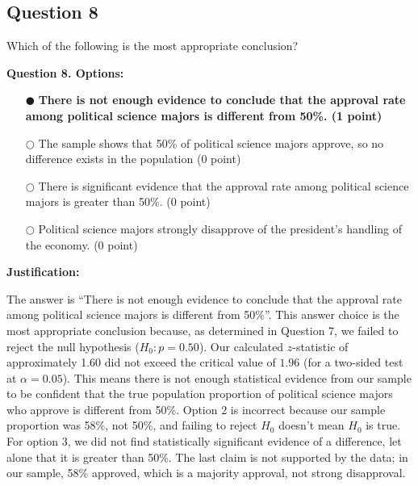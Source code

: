 \documentclass[12pt]{article}
\newcommand{\questionsep}{\vspace{1em}}
\begin{document}
\subsection*{Question 8 }
Which of the following is the most appropriate conclusion?

\medskip\noindent\textbf{Question 8. Options:}
\begin{itemize}[leftmargin=2em, labelsep=0.5em, itemsep=0.3em, topsep=0.3em]
    \item[$\mdlgblkcircle$] \textbf{There is not enough evidence to conclude that the approval rate among political science majors is different from 50\%. (1 point)}
    \item[$\bigcirc$] The sample shows that 50\% of political science majors approve, so no difference exists in the population (0 point)
    \item[$\bigcirc$] There is significant evidence that the approval rate among political science majors is greater than 50\%. (0 point)
    \item[$\bigcirc$] Political science majors strongly disapprove of the president's handling of the economy. (0 point)
\end{itemize}

\medskip\noindent\textbf{Justification:}

The answer is “There is not enough evidence to conclude that the approval rate among political science majors is different from 50\%”. This answer choice is the most appropriate conclusion because, as determined in Question 7, we failed to reject the null hypothesis ($H_0: p = 0.50$). Our calculated $z$-statistic of approximately 1.60 did not exceed the critical value of $1.96$ (for a two-sided test at $\alpha=0.05$). This means there is not enough statistical evidence from our sample to be confident that the true population proportion of political science majors who approve is different from 50\%. Option 2 is incorrect because our sample proportion was 58\%, not 50\%, and failing to reject $H_0$ doesn't mean $H_0$ is true. For option 3, we did not find statistically significant evidence of a difference, let alone that it is greater than 50\%. The last claim is not supported by the data; in our sample, 58\% approved, which is a majority approval, not strong disapproval.
\questionsep
\end{document}
